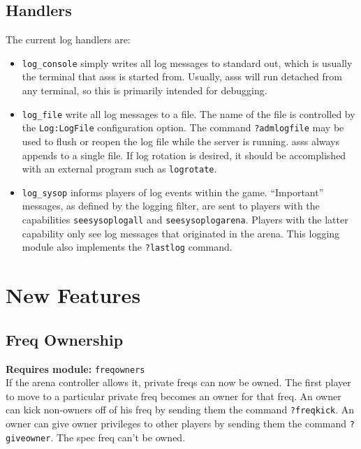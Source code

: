 \documentclass{article}
\newcommand{\requiremod}[1]{\noindent\textbf{Requires module:} \texttt{#1}\\}
\newcommand{\asss}{asss}
\begin{document}
\subsection{Handlers}

The current log handlers are:

\begin{itemize}

\item{\verb/log_console/} simply writes all log messages to standard
out, which is usually the terminal that \asss{} is started from.
Usually, \asss{} will run detached from any terminal, so this is
primarily intended for debugging.

\item{\verb/log_file/} write all log messages to a file. The name of the
file is controlled by the \verb/Log:LogFile/ configuration option. The
command \verb/?admlogfile/ may be used to flush or reopen the log file
while the server is running. \asss{} always appends to a single file. If
log rotation is desired, it should be accomplished with an external
program such as \verb/logrotate/.

\item{\verb/log_sysop/} informs players of log events within the game.
``Important'' messages, as defined by the logging filter, are sent to
players with the capabilities \verb/seesysoplogall/ and
\verb/seesysoplogarena/. Players with the latter capability only see log
messages that originated in the arena. This logging module also
implements the \verb/?lastlog/ command.

\end{itemize}


\section{New Features}

\subsection{Freq Ownership}

\requiremod{freqowners}
If the arena controller allows it, private freqs can now be owned. The
first player to move to a particular private freq becomes an owner for
that freq. An owner can kick non-owners off of his freq by sending them
the command \verb/?freqkick/. An owner can give owner privileges to
other players by sending them the command \verb/?giveowner/. The spec
freq can't be owned.
\end{document}
